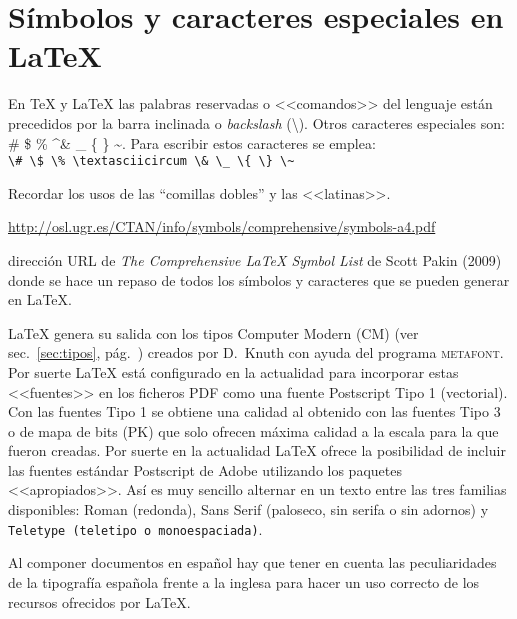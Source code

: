 \documentclass[11pt,a4paper]{article}
\begin{document}
\section[Símbolos]{Símbolos y caracteres especiales en \LaTeX{}}
\label{sec:simb} %

En \TeX{} y \LaTeX{} las palabras reservadas o <<comandos>> del lenguaje están precedidos por la barra inclinada o \emph{backslash} (\textbackslash). Otros caracteres especiales son: \# \$ \% \textasciicircum \& \_ \{ \} \~{}. Para escribir estos caracteres se emplea:\\
\verb!\# \$ \% \textasciicircum \& \_ \{ \} \~!

Recordar los usos de las ``comillas dobles'' y las <<latinas>>.


{\url{http://osl.ugr.es/CTAN/info/symbols/comprehensive/symbols-a4.pdf}}

\noindent dirección URL de \emph{The Comprehensive \LaTeX{} Symbol List} de Scott Pakin (2009) donde se hace un repaso de todos los símbolos y caracteres que se pueden generar en \LaTeX{}.

\LaTeX{} genera su salida con los tipos Computer Modern (CM) (ver sec.~\ref{sec:tipos}, pág.~\pageref{sec:tipos}) creados por D.~Knuth con ayuda del programa \textsc{metafont}. Por suerte \LaTeX{} está configurado en la actualidad para incorporar estas <<fuentes>> en los ficheros PDF como una fuente Postscript Tipo 1 (vectorial). Con las fuentes Tipo 1 se obtiene una calidad al obtenido con las fuentes Tipo 3 o de mapa de bits (PK) que solo ofrecen máxima calidad a la escala para la que fueron creadas. Por suerte en la actualidad \LaTeX{} ofrece la posibilidad de incluir las fuentes estándar Postscript de Adobe utilizando los paquetes <<apropiados>>. Así es muy sencillo alternar en un texto entre las tres familias disponibles: Roman (redonda), \textsf{Sans Serif (paloseco, sin serifa o sin adornos)} y \texttt{Teletype (teletipo o monoespaciada)}. 

Al componer documentos en español hay que tener en cuenta las peculiaridades de la tipografía española frente a la inglesa para hacer un uso correcto de los recursos ofrecidos por \LaTeX.
\end{document}
